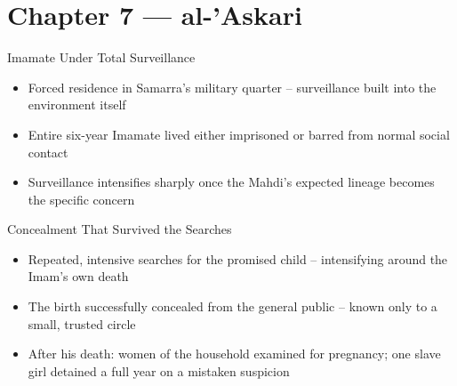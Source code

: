 \section{Chapter 7 — al-'Askari}


\begin{frame}{Imamate Under Total Surveillance}
\begin{itemize}[itemsep=5pt]
  \item Forced residence in Samarra's military quarter -- surveillance built into the environment itself
  \item Entire six-year Imamate lived either imprisoned or barred from normal social contact
  \item Surveillance intensifies sharply once the Mahdi's expected lineage becomes the specific concern
\end{itemize}
\end{frame}

\begin{frame}{Concealment That Survived the Searches}
\begin{itemize}[itemsep=5pt]
  \item Repeated, intensive searches for the promised child -- intensifying around the Imam's own death
  \item The birth successfully concealed from the general public -- known only to a small, trusted circle
  \item After his death: women of the household examined for pregnancy; one slave girl detained a full year on a mistaken suspicion
\end{itemize}
\end{frame}

